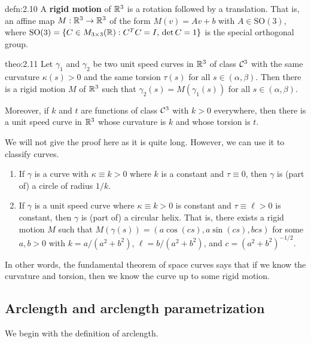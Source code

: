 \begin{defn}{defn:2.10}
    A {\bf rigid motion} of $\mathbb{R}^3$ is a rotation followed by a translation. 
    That is, an affine map $M : \mathbb{R}^3 \to \mathbb{R}^3$ of the form $M(v) = Av + b$
    with $A \in \text{SO}(3)$, where $\text{SO}(3) = \{C \in M_{3\times 3}(\mathbb{R}) 
    : C^TC = I,\, \det C = 1\}$ is the special orthogonal group.
\end{defn}\vspace{-0.25cm}

\begin{theo}{theo:2.11}
    Let $\gamma_1$ and $\gamma_2$ be two unit speed curves in $\mathbb{R}^3$ 
    of class ${\cal C}^3$ with the same curvature $\kappa(s) > 0$ 
    and the same torsion $\tau(s)$ for all $s \in (\alpha, \beta)$. 
    Then there is a rigid motion $M$ of $\mathbb{R}^3$ such that 
    $\gamma_2(s) = M(\gamma_1(s))$ for all $s \in (\alpha, \beta)$.

    Moreover, if $k$ and $t$ are functions of class ${\cal C}^3$ with $k > 0$ 
    everywhere, then there is a unit speed curve in $\mathbb{R}^3$ whose curvature 
    is $k$ and whose torsion is $t$. 
\end{theo}\vspace{-0.25cm}

We will not give the proof here as it is quite long. However, we can 
use it to classify curves. 
\begin{enumerate}[(1)]
    \item If $\gamma$ is a curve with $\kappa \equiv k > 0$ where $k$ is a 
    constant and $\tau \equiv 0$, then $\gamma$ is (part of) a circle of 
    radius $1/k$. 
    \item If $\gamma$ is a unit speed curve where $\kappa \equiv k > 0$ 
    is constant and $\tau \equiv \ell > 0$ is constant, then 
    $\gamma$ is (part of) a circular helix. That is, there exists a rigid 
    motion $M$ such that $M(\gamma(s)) = (a\cos(cs), a\sin(cs), bcs)$ 
    for some $a, b > 0$ with $k = a/(a^2+b^2)$, $\ell = b/(a^2+b^2)$, 
    and $c = (a^2+b^2)^{-1/2}$.
\end{enumerate}
In other words, the fundamental theorem of space curves says that 
if we know the curvature and torsion, then we know the curve up to 
some rigid motion.

\subsection{Arclength and arclength parametrization} \label{subsec:2.4}
We begin with the definition of arclength. 

